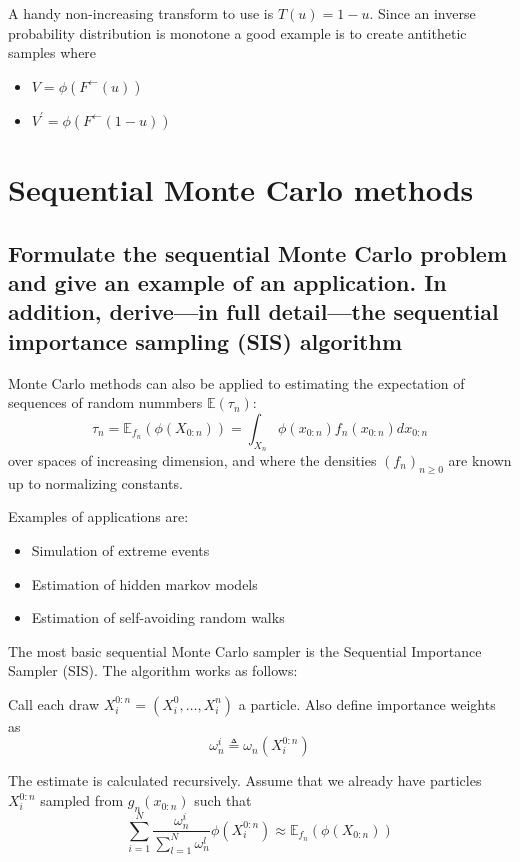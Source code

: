 \documentclass[a4paper]{article}
\begin{document}
A handy non-increasing transform to use is $T(u) = 1-u$. Since an inverse probability distribution is monotone a good example is to create antithetic samples where
\begin{itemize}
    \item $V = \phi(F^\leftarrow(u))$
    \item $V^\prime = \phi(F^\leftarrow(1-u))$
\end{itemize}

\newpage

\section{Sequential Monte Carlo methods}

\subsection[Sequential Importance Sampling]{Formulate the sequential Monte Carlo problem and give an example of an application. In addition, derive—in full detail—the sequential importance sampling (SIS) algorithm}

Monte Carlo methods can also be applied to estimating the expectation of sequences of random nummbers $\mathbb{E}(\tau_n)$:
\begin{equation}
    \tau_n = \mathbb{E}_{f_n}(\phi(X_{0:n})) = \int_{X_n}\phi(x_{0:n})f_n(x_{0:n})dx_{0:n} 
\end{equation}
over spaces of increasing dimension, and where the densities $(f_n)_{n\geq 0}$ are known up to normalizing constants.

Examples of applications are:
\begin{itemize}
    \item Simulation of extreme events
    \item Estimation of hidden markov models
    \item Estimation of self-avoiding random walks
\end{itemize}

The most basic sequential Monte Carlo sampler is the Sequential Importance Sampler (SIS). The algorithm works as follows:

Call each draw $X_i^{0:n} = (X_i^0, \dots , X_i^n)$ a particle. Also define importance weights as
\begin{equation}
    \omega_n^i \triangleq \omega_n(X_i^{0:n})
\end{equation}

The estimate is calculated recursively. Assume that we already have particles $X_i^{0:n}$ sampled from $g_n(x_{0:n})$ such that
\begin{equation}
    \sum_{i=1}^N\frac{\omega_n^i}{\sum_{l=1}^N\omega_n^l}\phi(X_i^{0:n}) \approx \mathbb{E}_{f_n}(\phi(X_{0:n}))
\end{equation}
\end{document}
